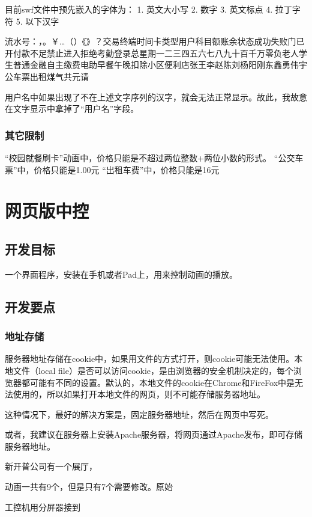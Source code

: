 目前swf文件中预先嵌入的字体为：
1. 英文大小写
2. 数字
3. 英文标点
4. 拉丁字符
5. 以下汉字

 流水号：，。￥…（）《》？交易终端时间卡类型用户科目额账余状态成功失败门已开付款不足禁止进入拒绝考勤登录总星期一二三四五六七八九十百千万零负老人学生普通金融自主缴费电助早餐午晚扣除小区便利店张王李赵陈刘杨阳刚东鑫勇伟宇公车票出租煤气共元请

用户名中如果出现了不在上述文字序列的汉字，就会无法正常显示。故此，我故意在文字显示中拿掉了“用户名”字段。

\subsection{其它限制}
“校园就餐刷卡”动画中，价格只能是不超过两位整数+两位小数的形式。
“公交车票”中，价格只能是1.00元
“出租车费”中，价格只能是16元


\chapter{网页版中控}
\section{开发目标}
一个界面程序，安装在手机或者Pad上，用来控制动画的播放。

\section{开发要点}
\subsection{地址存储}
服务器地址存储在cookie中，如果用文件的方式打开，则cookie可能无法使用。本地文件（local file）是否可以访问cookie，是由浏览器的安全机制决定的，每个浏览器都可能有不同的设置。默认的，本地文件的cookie在Chrome和FireFox中是无法使用的，所以如果打开本地文件的网页，则不可能存储服务器地址。

这种情况下，最好的解决方案是，固定服务器地址，然后在网页中写死。

或者，我建议在服务器上安装Apache服务器，将网页通过Apache发布，即可存储服务器地址。

新开普公司有一个展厅，

动画一共有9个，但是只有7个需要修改。原始

工控机用分屏器接到

